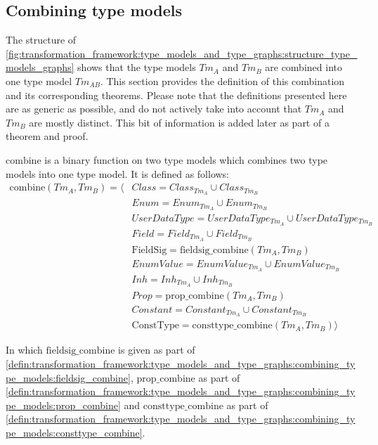\subsection{Combining type models}
\label{subsec:transformation_framework:type_models_and_type_graphs:combining_type_models}

The structure of \cref{fig:transformation_framework:type_models_and_type_graphs:structure_type_models_graphs} shows that the type models $Tm_A$ and $Tm_B$ are combined into one type model $Tm_{AB}$. This section provides the definition of this combination and its corresponding theorems. Please note that the definitions presented here are as generic as possible, and do not actively take into account that $Tm_{A}$ and $Tm_{B}$ are mostly distinct. This bit of information is added later as part of a theorem and proof.

\begin{defin}
\label{defin:transformation_framework:type_models_and_type_graphs:combining_type_models:combine}
$\mathrm{combine}$ is a binary function on two type models which combines two type models into one type model. It is defined as follows:
\begin{align*}
\mathrm{combine}(Tm_A, Tm_B) = \langle&
Class = Class_{Tm_A} \cup Class_{Tm_B} \\&
Enum = Enum_{Tm_A} \cup Enum_{Tm_B} \\&
UserDataType = UserDataType_{Tm_A} \cup UserDataType_{Tm_B} \\&
Field = Field_{Tm_A} \cup Field_{Tm_B} \\&
\mathrm{FieldSig} = \mathrm{fieldsig\_\!combine}(Tm_A, Tm_B) \\&
EnumValue = EnumValue_{Tm_A} \cup EnumValue_{Tm_B} \\&
Inh = Inh_{Tm_A} \cup Inh_{Tm_B} \\&
Prop = \mathrm{prop\_\!combine}(Tm_A, Tm_B) \\&
Constant = Constant_{Tm_A} \cup Constant_{Tm_B} \\&
\mathrm{ConstType} = \mathrm{consttype\_\!combine}(Tm_A, Tm_B)\rangle
\end{align*}

In which $\mathrm{fieldsig\_\!combine}$ is given as part of \cref{defin:transformation_framework:type_models_and_type_graphs:combining_type_models:fieldsig_combine}, $\mathrm{prop\_\!combine}$ as part of \cref{defin:transformation_framework:type_models_and_type_graphs:combining_type_models:prop_combine} and $\mathrm{consttype\_\!combine}$ as part of \cref{defin:transformation_framework:type_models_and_type_graphs:combining_type_models:consttype_combine}.
\end{defin}

